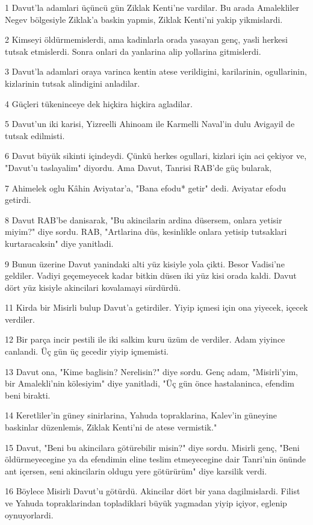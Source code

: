 \par 1 Davut'la adamlari üçüncü gün Ziklak Kenti'ne vardilar. Bu arada Amalekliler Negev bölgesiyle Ziklak'a baskin yapmis, Ziklak Kenti'ni yakip yikmislardi.
\par 2 Kimseyi öldürmemislerdi, ama kadinlarla orada yasayan genç, yasli herkesi tutsak etmislerdi. Sonra onlari da yanlarina alip yollarina gitmislerdi.
\par 3 Davut'la adamlari oraya varinca kentin atese verildigini, karilarinin, ogullarinin, kizlarinin tutsak alindigini anladilar.
\par 4 Güçleri tükeninceye dek hiçkira hiçkira agladilar.
\par 5 Davut'un iki karisi, Yizreelli Ahinoam ile Karmelli Naval'in dulu Avigayil de tutsak edilmisti.
\par 6 Davut büyük sikinti içindeydi. Çünkü herkes ogullari, kizlari için aci çekiyor ve, "Davut'u taslayalim" diyordu. Ama Davut, Tanrisi RAB'de güç bularak,
\par 7 Ahimelek oglu Kâhin Aviyatar'a, "Bana efodu* getir" dedi. Aviyatar efodu getirdi.
\par 8 Davut RAB'be danisarak, "Bu akincilarin ardina düsersem, onlara yetisir miyim?" diye sordu. RAB, "Artlarina düs, kesinlikle onlara yetisip tutsaklari kurtaracaksin" diye yanitladi.
\par 9 Bunun üzerine Davut yanindaki alti yüz kisiyle yola çikti. Besor Vadisi'ne geldiler. Vadiyi geçemeyecek kadar bitkin düsen iki yüz kisi orada kaldi. Davut dört yüz kisiyle akincilari kovalamayi sürdürdü.
\par 11 Kirda bir Misirli bulup Davut'a getirdiler. Yiyip içmesi için ona yiyecek, içecek verdiler.
\par 12 Bir parça incir pestili ile iki salkim kuru üzüm de verdiler. Adam yiyince canlandi. Üç gün üç gecedir yiyip içmemisti.
\par 13 Davut ona, "Kime baglisin? Nerelisin?" diye sordu. Genç adam, "Misirli'yim, bir Amalekli'nin kölesiyim" diye yanitladi, "Üç gün önce hastalaninca, efendim beni birakti.
\par 14 Keretliler'in güney sinirlarina, Yahuda topraklarina, Kalev'in güneyine baskinlar düzenlemis, Ziklak Kenti'ni de atese vermistik."
\par 15 Davut, "Beni bu akincilara götürebilir misin?" diye sordu. Misirli genç, "Beni öldürmeyecegine ya da efendimin eline teslim etmeyecegine dair Tanri'nin önünde ant içersen, seni akincilarin oldugu yere götürürüm" diye karsilik verdi.
\par 16 Böylece Misirli Davut'u götürdü. Akincilar dört bir yana dagilmislardi. Filist ve Yahuda topraklarindan topladiklari büyük yagmadan yiyip içiyor, eglenip oynuyorlardi.
